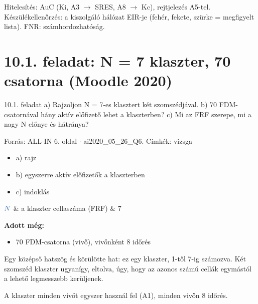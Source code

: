 Hitelesítés: AuC (Ki, A3 $\to$ SRES, A8 $\to$ Kc), rejtjelezés A5-tel. Készülékellenőrzés: a kiszolgáló hálózat EIR-je (fehér, fekete, szürke = megfigyelt lista). FNR: számhordozhatóság.

\section{\texorpdfstring{10.1. feladat: N = 7 klaszter, 70 csatorna (Moodle 2020)}{10.1. feladat: N = 7 klaszter, 70 csatorna (Moodle 2020)}}\label{ai10_01}
\setcounter{lepes}{0}
\begin{feladat}{10.1. feladat}
a) Rajzoljon N = 7-es klasztert két szomszédjával. b) 70 FDM-csatornával hány aktív előfizető lehet a klaszterben? c) Mi az FRF szerepe, mi a nagy N előnye és hátránya?

{\footnotesize\sffamily Forrás: ALL-IN 6. oldal $\cdot$ ai2020\_05\_26\_Q6. Címkék: vizsga}
\end{feladat}
\begin{keresunk}
\begin{itemize}
\item a) rajz
\item b) egyszerre aktív előfizetők a klaszterben
\item c) indoklás
\end{itemize}
\end{keresunk}
\begin{jeloles}
\begin{jeltabla}
$\ca{N}$ & a klaszter cellaszáma (FRF) & $7$\\
\end{jeltabla}
\par\smallskip\textbf{Adott még:}
\begin{itemize}
\item 70 FDM-csatorna (vivő), vivőnként 8 időrés
\end{itemize}
\end{jeloles}

Egy középső hatszög és körülötte hat: ez egy klaszter, 1-től 7-ig számozva. Két szomszéd klaszter ugyanígy, eltolva, úgy, hogy az azonos számú cellák egymástól a lehető legmesszebb kerüljenek.

A klaszter minden vivőt egyszer használ fel (A1), minden vivőn 8 időrés.

\begin{center}\end{center}

